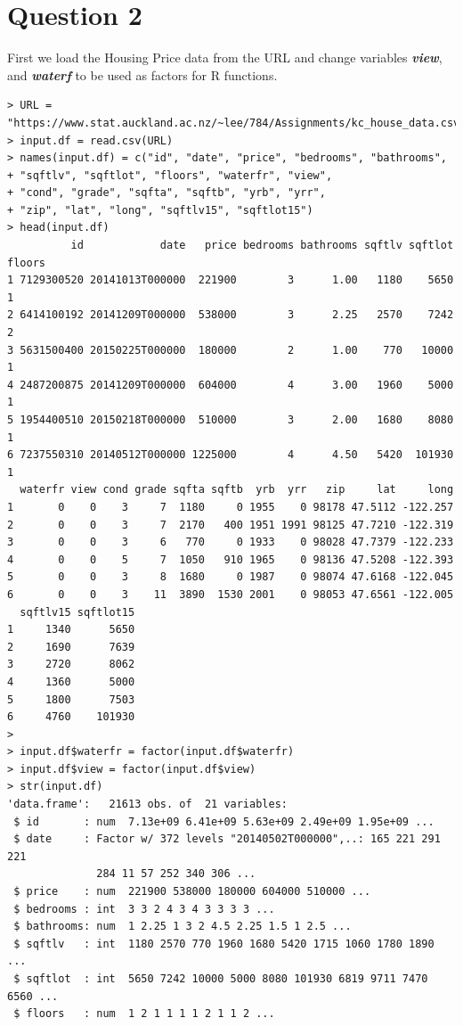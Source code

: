 \documentclass{article}%
\begin{document}
\section{Question 2}
First we load the Housing Price data from the URL and change variables \emph{\textbf{view}}, and \emph{\textbf{waterf}} to be used as factors for R functions.
\begin{verbatim}
> URL = "https://www.stat.auckland.ac.nz/~lee/784/Assignments/kc_house_data.csv"
> input.df = read.csv(URL)
> names(input.df) = c("id", "date", "price", "bedrooms", "bathrooms",
+ "sqftlv", "sqftlot", "floors", "waterfr", "view",
+ "cond", "grade", "sqfta", "sqftb", "yrb", "yrr",
+ "zip", "lat", "long", "sqftlv15", "sqftlot15")
> head(input.df)
          id            date   price bedrooms bathrooms sqftlv sqftlot floors
1 7129300520 20141013T000000  221900        3      1.00   1180    5650      1
2 6414100192 20141209T000000  538000        3      2.25   2570    7242      2
3 5631500400 20150225T000000  180000        2      1.00    770   10000      1
4 2487200875 20141209T000000  604000        4      3.00   1960    5000      1
5 1954400510 20150218T000000  510000        3      2.00   1680    8080      1
6 7237550310 20140512T000000 1225000        4      4.50   5420  101930      1
  waterfr view cond grade sqfta sqftb  yrb  yrr   zip     lat     long
1       0    0    3     7  1180     0 1955    0 98178 47.5112 -122.257
2       0    0    3     7  2170   400 1951 1991 98125 47.7210 -122.319
3       0    0    3     6   770     0 1933    0 98028 47.7379 -122.233
4       0    0    5     7  1050   910 1965    0 98136 47.5208 -122.393
5       0    0    3     8  1680     0 1987    0 98074 47.6168 -122.045
6       0    0    3    11  3890  1530 2001    0 98053 47.6561 -122.005
  sqftlv15 sqftlot15
1     1340      5650
2     1690      7639
3     2720      8062
4     1360      5000
5     1800      7503
6     4760    101930
>
> input.df$waterfr = factor(input.df$waterfr)
> input.df$view = factor(input.df$view)
> str(input.df)
'data.frame':   21613 obs. of  21 variables:
 $ id       : num  7.13e+09 6.41e+09 5.63e+09 2.49e+09 1.95e+09 ...
 $ date     : Factor w/ 372 levels "20140502T000000",..: 165 221 291 221
              284 11 57 252 340 306 ...
 $ price    : num  221900 538000 180000 604000 510000 ...
 $ bedrooms : int  3 3 2 4 3 4 3 3 3 3 ...
 $ bathrooms: num  1 2.25 1 3 2 4.5 2.25 1.5 1 2.5 ...
 $ sqftlv   : int  1180 2570 770 1960 1680 5420 1715 1060 1780 1890 ...
 $ sqftlot  : int  5650 7242 10000 5000 8080 101930 6819 9711 7470 6560 ...
 $ floors   : num  1 2 1 1 1 1 2 1 1 2 ...

\end{verbatim}
\end{document}
